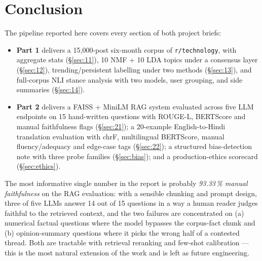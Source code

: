 \documentclass[11pt,a4paper]{article}
\begin{document}
\section{Conclusion}

The pipeline reported here covers every section of both project briefs:

\begin{itemize}
  \item \textbf{Part 1} delivers a 15{,}000-post six-month corpus of \texttt{r/technology}, with
        aggregate stats (\S\ref{sec:11}), 10 NMF + 10 LDA topics under a consensus layer
        (\S\ref{sec:12}), trending/persistent labelling under two methods (\S\ref{sec:13}), and
        full-corpus NLI stance analysis with two models, user grouping, and side summaries
        (\S\ref{sec:14}).
  \item \textbf{Part 2} delivers a FAISS + MiniLM RAG system evaluated across five LLM endpoints
        on 15 hand-written questions with ROUGE-L, BERTScore and manual faithfulness flags
        (\S\ref{sec:21}); a 20-example English-to-Hindi translation evaluation with chrF,
        multilingual BERTScore, manual fluency/adequacy and edge-case tags (\S\ref{sec:22});
        a structured bias-detection note with three probe families (\S\ref{sec:bias}); and a
        production-ethics scorecard (\S\ref{sec:ethics}).
\end{itemize}

The most informative single number in the report is probably \emph{93.33\,\% manual faithfulness}
on the RAG evaluation: with a sensible chunking and prompt design, three of five LLMs answer
14 out of 15 questions in a way a human reader judges faithful to the retrieved context, and the
two failures are concentrated on (a) numerical factual questions where the model bypasses the
corpus-fact chunk and (b) opinion-summary questions where it picks the wrong half of a contested
thread. Both are tractable with retrieval reranking and few-shot calibration --- this is the most
natural extension of the work and is left as future engineering.
\end{document}
